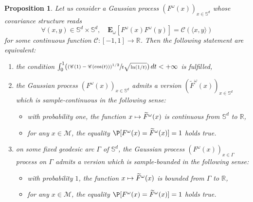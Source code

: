 \documentclass[10pt]{amsart}
\newcommand{\Psfrac}[2]{(\sfrac{#1}{#2})}
\def\mto{\mathchoice{\longmapsto}{\mapsto}{\mapsto}{\mapsto}}
\newenvironment{enumeratei}
{\bgroup\def\theenumi{\roman{enumi}}\def\theenumii{\arabic{enumii}}\begin{enumerate}}
{\end{enumerate}\egroup}
\theoremstyle{theorem}
\newtheorem{prop}[theo]{Proposition}
\theoremstyle{definition}
\newcommand\R{\mathbb{R}}
\newcommand\E{\mathbf{E}}
\newcommand\bbS{\mathbb{S}}
\begin{document}
\begin{prop}\label{casSd}
Let us consider a Gaussian process $(F^\omega(x))_{x\in \bbS^d}$ whose covariance structure reads
\begin{equation}\label{covSD}
\forall (x,y)\in \bbS^d\times \bbS^d, \quad \E_\omega[F^\omega(x) F^\omega(y)]=\mathscr{C}(\langle x, y\rangle)
\end{equation}
for some continuous function $\mathscr{C}:[-1,1]\to \R$. Then the following statement are equivalent:
\begin{enumeratei}
\item\label{casSdi} the condition $\int_{0}^{1} \Psfrac{(\mathscr{C}(1)-\mathscr{C}(\cos(t)))^{1/2}}{t\sqrt{\ln(1/t)}}\, dt<+\infty$ is fulfilled,
\item\label{casSdii} the Gaussian process $(F^\omega(x))_{x\in \bbS^d}$ admits a version $(\widetilde{F}^\omega(x))_{x\in \bbS^d}$ which is sample-continuous in the following sense:
\begin{itemize}
\item with probability one, the function $x\mto \widetilde{F}^{\omega}(x)$ is continuous from
$\bbS^d$ to $\R$,
\item for any $x\in \mathcal{M}$, the equality $\P[F^{\omega}(x)=\widetilde{F}^{\omega}(x)]=1$ holds true.
\end{itemize}
\item\label{casSdiii} on some fixed geodesic arc $\Gamma$ of $\bbS^d$, the Gaussian process $(F^\omega(x))_{x\in \Gamma}$ process on $\Gamma$ admits a version which is sample-bounded in the following sense:
\begin{itemize}
\item with probability $1$, the function $x \mto \widetilde{F}^{\omega}(x)$ is bounded from $\Gamma$ to $\R$,
\item for any $x\in \mathcal{M}$, the equality $\P[F^{\omega}(x)=\widetilde{F}^{\omega}(x)]=1$ holds true.
\end{itemize}
\end{enumeratei}
\end{prop}
\end{document}
